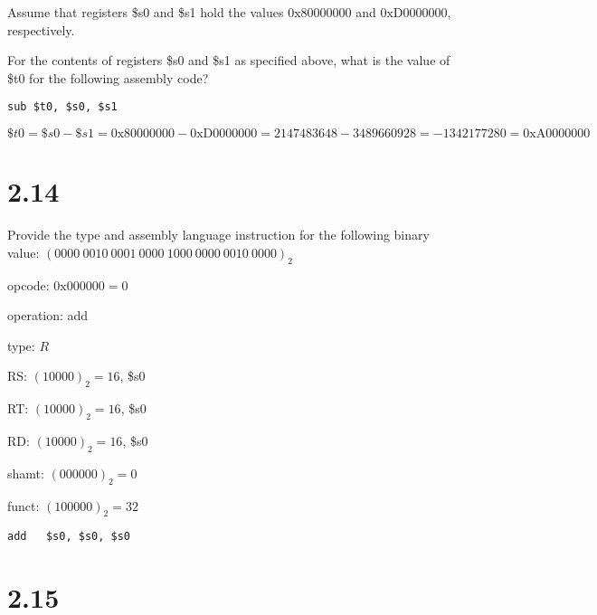 \documentclass[paper=a4, fontsize=11pt]{scrartcl} %
\begin{document}
\begin{fancyquotes}
  Assume that registers \$s0 and \$s1 hold the values
  $\mathrm{0x80000000}$ and $\mathrm{0xD0000000}$, respectively.

  For the contents of registers \$s0 and \$s1 as specified above, what
  is the value of \$t0 for the following assembly code?
\end{fancyquotes}

\begin{lstlisting}[language={[mips]Assembler}]
  sub $t0, $s0, $s1
\end{lstlisting}                %

$\$t0 = \$s0 - \$s1 = \mathrm{0x80000000} - \mathrm{0xD0000000}
= 2147483648 - 3489660928
= -1342177280 = \mathrm{0xA0000000}$

\section{2.14}

\begin{fancyquotes}
  Provide the type and assembly language instruction for the following
  binary value: ${(0000\ 0010\ 0001\ 0000\ 1000\ 0000\ 0010\ 0000)}_2$
\end{fancyquotes}

opcode: $\mathrm{0x000000} = 0$

operation: add

type: $R$

RS: ${(10000)}_2 = 16$, \$s0

RT: ${(10000)}_2 = 16$, \$s0

RD: ${(10000)}_2 = 16$, \$s0

shamt: ${(000000)}_2 = 0$

funct: ${(100000)}_2 = 32$

\begin{lstlisting}[language={[mips]Assembler}]
  add	$s0, $s0, $s0
\end{lstlisting}                %


\section{2.15}
\end{document}
